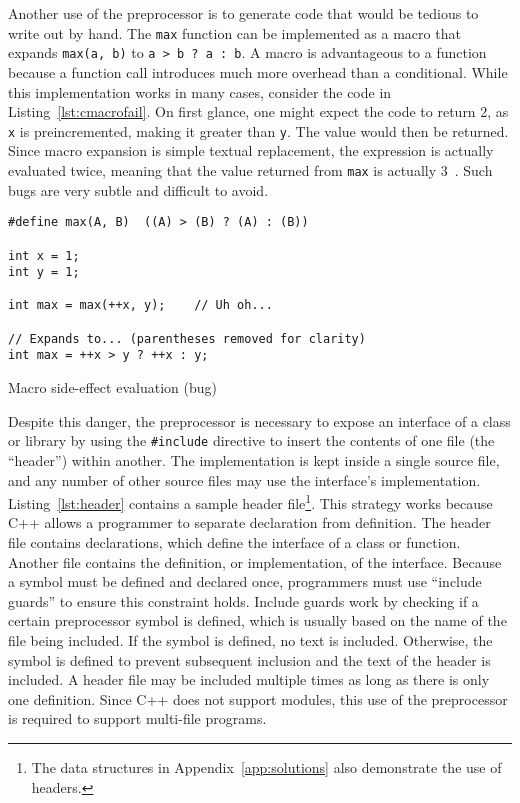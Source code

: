 \documentclass[finalcopy]{srpaper}
\begin{document}
Another use of the preprocessor is to generate code that would be tedious to
write out by hand. The \texttt{max} function can be implemented as a macro that
expands \texttt{max(a, b)} to \texttt{a > b ?\ a :\ b}. A macro is advantageous
to a function because a function call introduces much more overhead than a
conditional. While this implementation works in many cases, consider the code
in Listing~\ref{lst:cmacrofail}. On first glance, one might expect the code to
return 2, as \texttt{x} is preincremented, making it greater than \texttt{y}.
The value would then be returned. Since macro expansion is simple textual
replacement, the expression is actually evaluated twice, meaning that the value
returned from \texttt{max} is actually 3~\cite{gnupreproc}. Such bugs are very
subtle and difficult to avoid.

\begin{listing}[H]
\begin{verbatim}
#define max(A, B)  ((A) > (B) ? (A) : (B))

int x = 1;
int y = 1;

int max = max(++x, y);    // Uh oh...

// Expands to... (parentheses removed for clarity)
int max = ++x > y ? ++x : y;
\end{verbatim}
\caption{Macro side-effect evaluation (bug)}
\label{lst:cmacrofail}
\end{listing}

Despite this danger, the preprocessor is necessary to expose an interface of a
class or library by using the \texttt{\#include} directive to insert the
contents of one file (the ``header'') within another. The implementation is
kept inside a single source file, and any number of other source files may use
the interface's implementation. Listing~\ref{lst:header} contains a sample
header file\footnote{The data structures in Appendix~\ref{app:solutions} also
demonstrate the use of headers.}. This strategy works because C++ allows a
programmer to separate declaration from definition. The header file contains
declarations, which define the interface of a class or function. Another file
contains the definition, or implementation, of the interface. Because a symbol
must be defined and declared once, programmers must use ``include guards'' to
ensure this constraint holds. Include guards work by checking if a certain
preprocessor symbol is defined, which is usually based on the name of the file
being included. If the symbol is defined, no text is included. Otherwise, the
symbol is defined to prevent subsequent inclusion and the text of the header is
included. A header file may be included multiple times as long as there is only
one definition. Since C++ does not support modules, this use of the
preprocessor is required to support multi-file programs.
\end{document}
